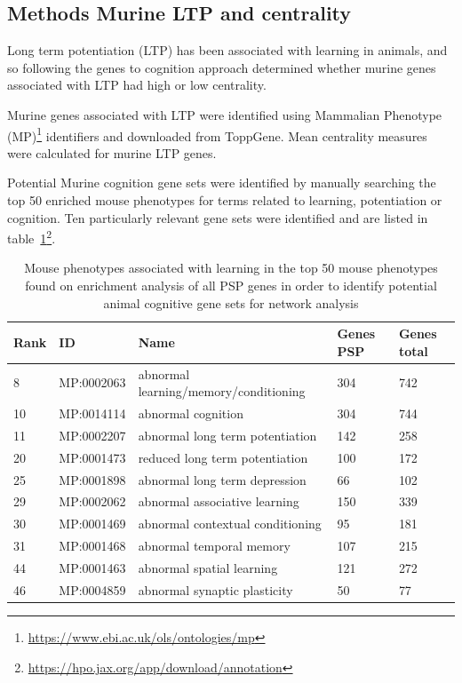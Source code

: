 \subsection{Methods Murine LTP and centrality}
\label{sec:methods murine LTP and centrality}
Long term potentiation (LTP) has been associated with learning in animals, and so following the genes to cognition approach determined whether murine genes associated with LTP had high or low centrality.



Murine genes associated with LTP were identified using Mammalian Phenotype (MP)\footnote{\url{https://www.ebi.ac.uk/ols/ontologies/mp}} identifiers\cite{bult2019mouse} and downloaded from ToppGene\cite{chen2009toppgene}. Mean centrality measures were calculated for murine LTP genes.

Potential Murine cognition gene sets were identified by manually searching the top 50 enriched mouse phenotypes for terms related to learning, potentiation or cognition. Ten particularly relevant gene sets were identified and are listed in table~\ref{tab:mouse_learning}\footnote{\url{https://hpo.jax.org/app/download/annotation}}.


\begin{table}[]
    \centering
    \setlength{\extrarowheight}{2pt}
    \begin{tabular}{lllll}
    \toprule
    Rank & ID & Name & Genes PSP & Genes total\\
    \midrule
        8 & MP:0002063 & abnormal learning/memory/conditioning & 304 & 742  \\
        10 & MP:0014114 & abnormal cognition & 304 & 744 \\
        11 & MP:0002207 & abnormal long term potentiation & 142 & 258 \\
        20 & MP:0001473 & reduced long term potentiation & 100 & 172 \\
        25 & MP:0001898 & abnormal long term depression & 66 & 102 \\
        29 & MP:0002062 & abnormal associative learning & 150 & 339 \\
        30 & MP:0001469 & abnormal contextual conditioning & 95 & 181 \\
        31 & MP:0001468 & abnormal temporal memory & 107 & 215\\
        44 & MP:0001463 & abnormal spatial learning & 121 & 272\\
        46 & MP:0004859 &abnormal synaptic plasticity & 50 & 77 \\
        \bottomrule
    \end{tabular}
    \caption[Mammalian phenotypes (MP) associated with learning and long term potentiation]{Mouse phenotypes associated with learning in the top 50 mouse phenotypes found on enrichment analysis of all PSP genes in order to identify potential animal cognitive gene sets for network analysis}
    \label{tab:mouse_learning}
\end{table}

